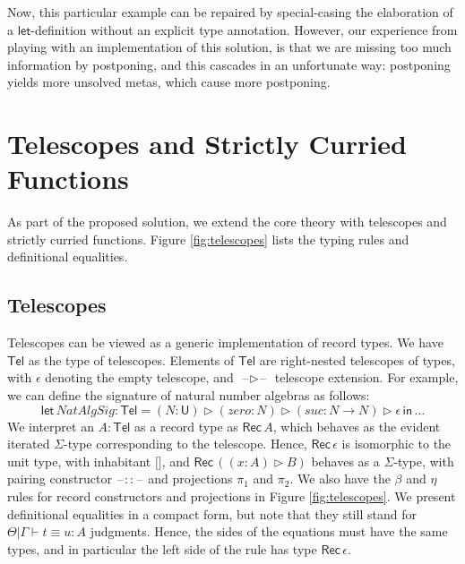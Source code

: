 \documentclass[acmsmall,review,anonymous,prologue,dvipsnames]{acmart}\settopmatter{printfolios=true,printccs=false,printacmref=false}
\newcommand{\slet}{\boldsymbol{\mathsf{let}}}
\renewcommand{\sin}{\boldsymbol{\mathsf{in}}}
\renewcommand{\U}{\mathsf{U}}
\newcommand{\blank}{\mathord{\hspace{1pt}\text{--}\hspace{1pt}}}
\newcommand{\Tel}{\mathsf{Tel}}
\newcommand{\TCons}{\triangleright}
\newcommand{\Rec}{\mathsf{Rec}}
\theoremstyle{remark}
\begin{document}
Now, this particular example can be repaired by special-casing the elaboration
of a $\slet$-definition without an explicit type annotation. However, our
experience from playing with an implementation of this solution, is that we are
missing too much information by postponing, and this cascades in an unfortunate
way: postponing yields more unsolved metas, which cause more postponing.

\section{Telescopes and Strictly Curried Functions}

As part of the proposed solution, we extend the core theory with telescopes and
strictly curried functions. Figure \ref{fig:telescopes} lists the typing rules and
definitional equalities.

\subsection{Telescopes}
Telescopes can be viewed as a generic implementation of record types. We have
$\Tel$ as the type of telescopes. Elements of $\Tel$ are right-nested telescopes
of types, with $\epsilon$ denoting the empty telescope, and $\blank\TCons\blank$
telescope extension. For example, we can define the signature of natural number
algebras as follows:
\[
  \slet\,NatAlgSig : \Tel = (N : \U) \TCons (zero : N) \TCons (suc : N \to N) \TCons \epsilon\,\sin\,...
\]
We interpret an $A : \Tel$ as a record type as $\Rec\,A$, which behaves as the
evident iterated $\Sigma$-type corresponding to the telescope. Hence,
$\Rec\,\epsilon$ is isomorphic to the unit type, with inhabitant ${[}{]}$, and
$\Rec\,((x : A) \TCons B)$ behaves as a $\Sigma$-type, with pairing constructor
$\blank::\blank$ and projections $\pi_1$ and $\pi_2$. We also have the $\beta$
and $\eta$ rules for record constructors and projections in Figure
\ref{fig:telescopes}. We present definitional equalities in a compact form, but
note that they still stand for $\boxed{\Theta|\Gamma\vdash t \equiv u : A}$
judgments. Hence, the sides of the equations must have the same types, and in
particular the left side of the \LabTirName{${[}{]}$-$\eta$} rule has type
$\Rec\,\epsilon$.
\end{document}
